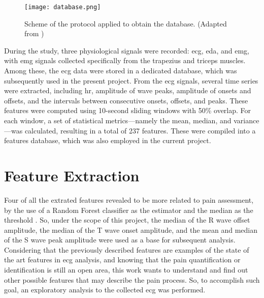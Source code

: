 \begin{figure}[h!]
    \centering
    \texttt{[image: database.png]}
    \caption{Scheme of the protocol applied to obtain the database. (Adapted from \cite{Alves2024})}
    \label{fig:database}
\end{figure}

During the study, three physiological signals were recorded: \ac{ecg}, \ac{eda}, and \ac{emg}, with \ac{emg} signals collected specifically from the trapezius and triceps muscles. Among these, the \ac{ecg} data were stored in a dedicated database, which was subsequently used in the present project.
From the \ac{ecg} signals, several time series were extracted, including \ac{hr}, amplitude of wave peaks, amplitude of onsets and offsets, and the intervals between consecutive onsets, offsets, and peaks. These features were computed using 10-second sliding windows with 50\% overlap.
For each window, a set of statistical metrics—namely the mean, median, and variance—was calculated, resulting in a total of 237 features. These were compiled into a features database, which was also employed in the current project. 





\section{Feature Extraction}
Four of all the extrated features revealed to be more related to pain assessment, by the use of a Random Forest classifier as the estimator and
the median as the threshold \cite{Alves2024}. So, under the scope of this project, the median of the R wave offset amplitude, the median of the T wave onset amplitude, and the mean and median of the S wave peak amplitude were used as a base for subsequent analysis.
Considering that the previously described features are examples of the state of the art features in \ac{ecg} analysis, and knowing that the pain quantification or identification is still an open area, this work wants to understand and find out other possible features that may describe the pain process. So, to accomplish such goal, an exploratory analysis to the collected \ac{ecg} was performed.


